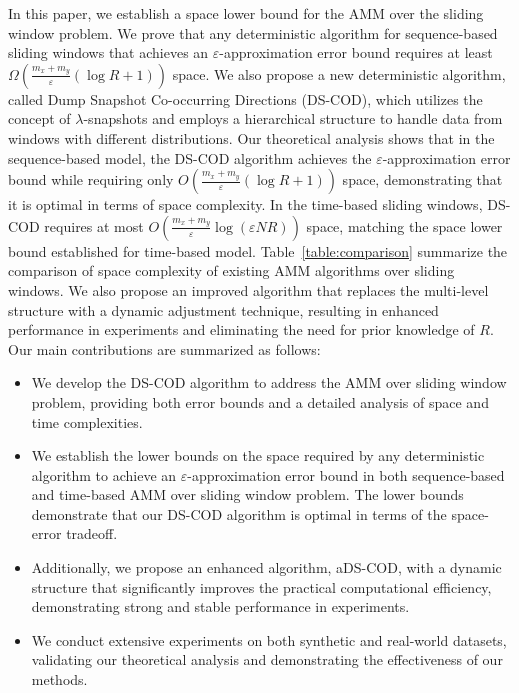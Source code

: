 In this paper, we establish a space lower bound for the AMM over the sliding window problem. We prove that any deterministic algorithm for sequence-based sliding windows that achieves an \( \varepsilon \)-approximation error bound requires at least \( \Omega\left(\frac{m_x + m_y}{\varepsilon} (\log{R}+1)\right) \) space. We also propose a new deterministic algorithm, called Dump Snapshot Co-occurring Directions (DS-COD), which utilizes the concept of \( \lambda \)-snapshots \cite{lee2006simpler} and employs a hierarchical structure to handle data from windows with different distributions. Our theoretical analysis shows that in the sequence-based model, the DS-COD algorithm achieves the \( \varepsilon \)-approximation error bound while requiring only \( O\left(\frac{m_x + m_y}{\varepsilon} (\log{R}+1)\right) \) space, demonstrating that it is optimal in terms of space complexity. In the time-based sliding windows, DS-COD requires at most \( O\left(\frac{m_x + m_y}{\varepsilon} \log{(\varepsilon N R)}\right) \) space, matching the space lower bound established for time-based model.
Table~\ref{table:comparison} summarize the comparison of space complexity of existing AMM algorithms over sliding windows.
We also propose an improved algorithm that replaces the multi-level structure with a dynamic adjustment technique, resulting in enhanced performance in experiments and eliminating the need for prior knowledge of $R$. Our main contributions are summarized as follows:
\begin{itemize}
    \item We develop  the DS-COD algorithm to address the AMM over sliding window problem, providing both error bounds and a detailed analysis of space and time complexities.
    \item We establish the lower bounds on the space required by any deterministic algorithm to achieve an $\varepsilon$-approximation error bound in both sequence-based and time-based AMM over sliding window problem. The lower bounds demonstrate that our DS-COD algorithm is optimal in terms of the space-error tradeoff.
    \item Additionally, we propose an enhanced algorithm, aDS-COD, with a dynamic structure that significantly improves the practical computational efficiency, demonstrating strong and stable performance in experiments.
    \item We conduct extensive experiments on both synthetic and real-world datasets, validating our theoretical analysis and demonstrating the effectiveness of our methods.
\end{itemize}
